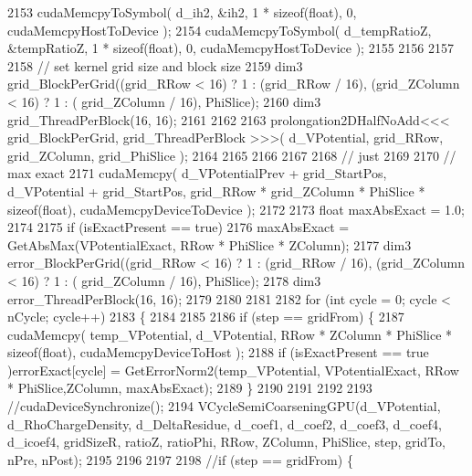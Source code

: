 \begin{DoxyCode}
2153         cudaMemcpyToSymbol( d\_ih2, &ih2, 1 * \textcolor{keyword}{sizeof}(\textcolor{keywordtype}{float}), 0, cudaMemcpyHostToDevice );
2154         cudaMemcpyToSymbol( d\_tempRatioZ, &tempRatioZ, 1 * \textcolor{keyword}{sizeof}(\textcolor{keywordtype}{float}), 0, cudaMemcpyHostToDevice );
2155 
2156         
2157 
2158         \textcolor{comment}{// set kernel grid size and block size}
2159         dim3 grid\_BlockPerGrid((grid\_RRow < 16) ? 1 : (grid\_RRow / 16), (grid\_ZColumn < 16) ? 1 : (
      grid\_ZColumn / 16), PhiSlice);
2160         dim3 grid\_ThreadPerBlock(16, 16);
2161 
2162 
2163         prolongation2DHalfNoAdd<<< grid\_BlockPerGrid, grid\_ThreadPerBlock >>>( d\_VPotential, grid\_RRow, 
      grid\_ZColumn, grid\_PhiSlice );
2164 
2165 
2166         
2167 
2168         \textcolor{comment}{// just }
2169         
2170         \textcolor{comment}{// max exact}
2171         cudaMemcpy( d\_VPotentialPrev + grid\_StartPos, d\_VPotential + grid\_StartPos, grid\_RRow * 
      grid\_ZColumn * PhiSlice * \textcolor{keyword}{sizeof}(\textcolor{keywordtype}{float}), cudaMemcpyDeviceToDevice );
2172                 
2173         \textcolor{keywordtype}{float} maxAbsExact = 1.0;
2174 
2175         \textcolor{keywordflow}{if} (isExactPresent == \textcolor{keyword}{true})
2176             maxAbsExact = GetAbsMax(VPotentialExact, RRow * PhiSlice * ZColumn);
2177         dim3 error\_BlockPerGrid((grid\_RRow < 16) ? 1 : (grid\_RRow / 16), (grid\_ZColumn < 16) ? 1 : (
      grid\_ZColumn / 16), PhiSlice);
2178         dim3 error\_ThreadPerBlock(16, 16);      
2179 
2180         
2181 
2182         \textcolor{keywordflow}{for} (\textcolor{keywordtype}{int} cycle = 0; cycle < nCycle; cycle++)
2183         \{
2184 
2185                 
2186             \textcolor{keywordflow}{if} (step == gridFrom) \{
2187                 cudaMemcpy( temp\_VPotential, d\_VPotential, RRow * ZColumn * PhiSlice * \textcolor{keyword}{sizeof}(\textcolor{keywordtype}{float}), 
      cudaMemcpyDeviceToHost );
2188                 \textcolor{keywordflow}{if} (isExactPresent == \textcolor{keyword}{true} )errorExact[cycle] = GetErrorNorm2(temp\_VPotential, 
      VPotentialExact, RRow * PhiSlice,ZColumn, maxAbsExact); 
2189             \}
2190 
2191 
2192 
2193             \textcolor{comment}{//cudaDeviceSynchronize();}
2194             VCycleSemiCoarseningGPU(d\_VPotential, d\_RhoChargeDensity, d\_DeltaResidue, d\_coef1, d\_coef2, 
      d\_coef3, d\_coef4, d\_icoef4, gridSizeR, ratioZ, ratioPhi, RRow, ZColumn, PhiSlice, step, gridTo, nPre, nPost);
2195             
2196 
2197 
2198                 \textcolor{comment}{//if (step == gridFrom) \{}

\end{DoxyCode}
